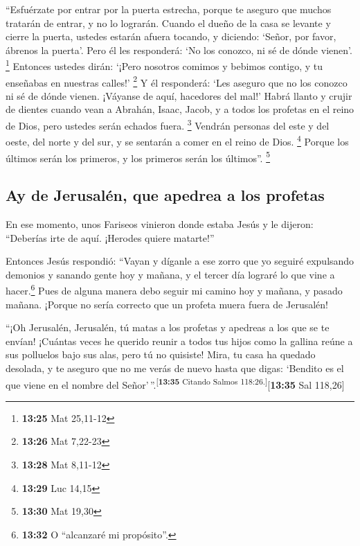  ``Esfuérzate por entrar por la puerta estrecha, porque
te aseguro que muchos tratarán de entrar, y no lo lograrán.
 Cuando el dueño de la casa se levante y cierre la
puerta, ustedes estarán afuera tocando, y diciendo: `Señor, por favor,
ábrenos la puerta'. Pero él les responderá: `No los conozco, ni sé de
dónde vienen'. \footnote{\textbf{13:25} Mat 25,11-12} 
Entonces ustedes dirán: `¡Pero nosotros comimos y bebimos contigo, y tu
enseñabas en nuestras calles!' \footnote{\textbf{13:26} Mat 7,22-23}
 Y él responderá: `Les aseguro que no los conozco ni sé
de dónde vienen. ¡Váyanse de aquí, hacedores del mal!' 
Habrá llanto y crujir de dientes cuando vean a Abrahán, Isaac, Jacob, y
a todos los profetas en el reino de Dios, pero ustedes serán echados
fuera. \footnote{\textbf{13:28} Mat 8,11-12}  Vendrán
personas del este y del oeste, del norte y del sur, y se sentarán a
comer en el reino de Dios. \footnote{\textbf{13:29} Luc 14,15}
 Porque los últimos serán los primeros, y los primeros
serán los últimos''. \footnote{\textbf{13:30} Mat 19,30}

\hypertarget{ay-de-jerusaluxe9n-que-apedrea-a-los-profetas}{%
\subsection{Ay de Jerusalén, que apedrea a los
profetas}\label{ay-de-jerusaluxe9n-que-apedrea-a-los-profetas}}

 En ese momento, unos Fariseos vinieron donde estaba
Jesús y le dijeron: ``Deberías irte de aquí. ¡Herodes quiere matarte!''

 Entonces Jesús respondió: ``Vayan y díganle a ese zorro
que yo seguiré expulsando demonios y sanando gente hoy y mañana, y el
tercer día lograré lo que vine a hacer.\footnote{\textbf{13:32} O
  ``alcanzaré mi propósito''.}  Pues de alguna manera
debo seguir mi camino hoy y mañana, y pasado mañana. ¡Porque no sería
correcto que un profeta muera fuera de Jerusalén!

 ``¡Oh Jerusalén, Jerusalén, tú matas a los profetas y
apedreas a los que se te envían! ¡Cuántas veces he querido reunir a
todos tus hijos como la gallina reúne a sus polluelos bajo sus alas,
pero tú no quisiste!  Mira, tu casa ha quedado desolada,
y te aseguro que no me verás de nuevo hasta que digas: `Bendito es el
que viene en el nombre del Señor'\,''.\textsuperscript{{[}\textbf{13:35}
Citando Salmos 118:26.{]}}{[}\textbf{13:35} Sal 118,26{]}

